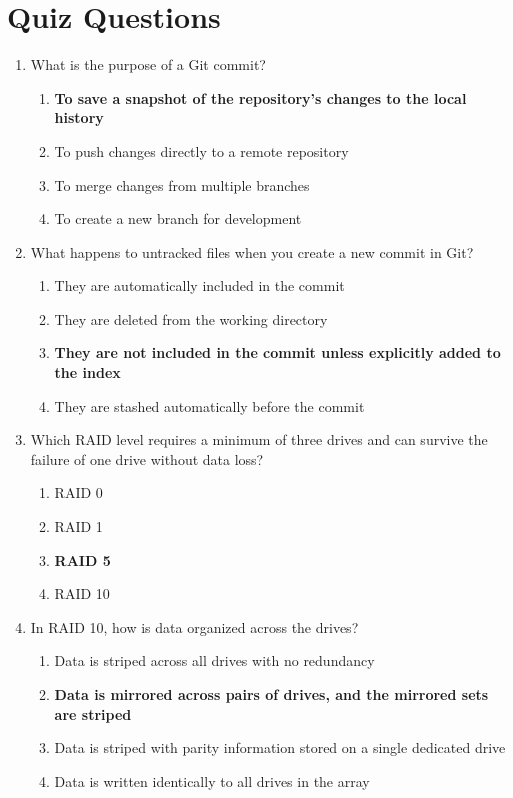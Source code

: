 \newpage

\section{Quiz Questions}

\begin{enumerate}
    \item What is the purpose of a Git commit?
    \begin{enumerate}
        \item \textbf{To save a snapshot of the repository's changes to the
              local history}
        \item To push changes directly to a remote repository
        \item To merge changes from multiple branches
        \item To create a new branch for development
    \end{enumerate}

    \item What happens to untracked files when you create a new commit in Git?
    \begin{enumerate}
        \item They are automatically included in the commit
        \item They are deleted from the working directory
        \item \textbf{They are not included in the commit unless explicitly
              added to the index}
        \item They are stashed automatically before the commit
    \end{enumerate}

    \item Which RAID level requires a minimum of three drives and can survive
          the failure of one drive without data loss?
    \begin{enumerate}
        \item RAID 0
        \item RAID 1
        \item \textbf{RAID 5}
        \item RAID 10
    \end{enumerate}

    \item In RAID 10, how is data organized across the drives?
    \begin{enumerate}
        \item Data is striped across all drives with no redundancy
        \item \textbf{Data is mirrored across pairs of drives, and the mirrored
                      sets are striped}
        \item Data is striped with parity information stored on a single
              dedicated drive
        \item Data is written identically to all drives in the array
    \end{enumerate}


\end{enumerate}
